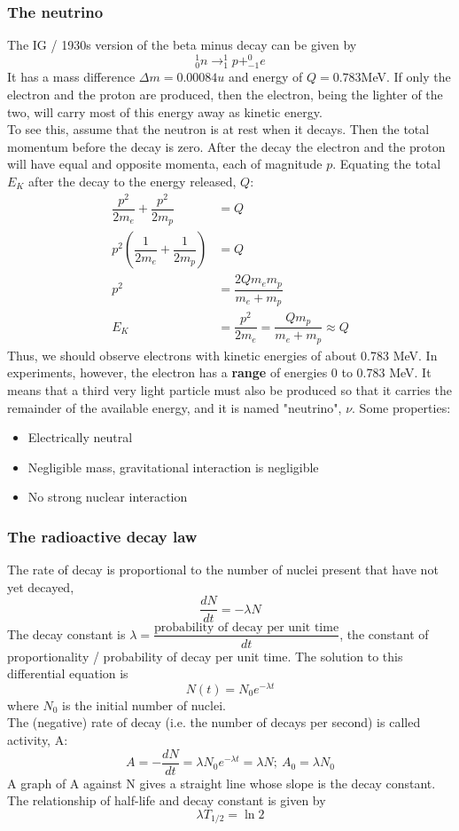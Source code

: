 \documentclass[a4paper,12pt]{article}
\begin{document}
\subsubsection*{The neutrino}
The IG / 1930s version of the beta minus decay can be given by
\[^1_0n\rightarrow ^1_1p+^0_{-1}e\]
It has a mass difference $\Delta m=0.00084u$ and energy of $Q=0.783$MeV.
If only the electron and the proton are produced, then the electron, being the lighter of the two, will carry most of this energy away as kinetic energy. \\
To see this, assume that the neutron is at rest when it decays. Then the total momentum before the decay is zero. After the decay the electron and the proton will have equal and opposite momenta, each of magnitude $p$. Equating the total $E_K$ after the decay to the energy released, $Q$:
\[
\begin{aligned}
  \dfrac{p^2}{2m_e}+\dfrac{p^2}{2m_p}&=Q\\
  p^2\left(\dfrac{1}{2m_e}+\dfrac{1}{2m_p}\right)&=Q\\
  p^2&=\dfrac{2Qm_em_p}{m_e+m_p}\\
  E_K&=\dfrac{p^2}{2m_e}=\dfrac{Qm_p}{m_e+m_p}\approx Q
\end{aligned}\]
Thus, we should observe electrons with kinetic energies of about 0.783 MeV. In experiments, however, the electron has a \textbf{range} of energies 0 to 0.783 MeV.
It means that a third very light particle must also be produced so that it carries the remainder of the available energy, and it is named "neutrino", $\nu$. Some properties:
\begin{itemize}
  \item Electrically neutral
  \item Negligible mass, gravitational interaction is negligible
  \item No strong nuclear interaction
\end{itemize}
\subsubsection*{The radioactive decay law}
The rate of decay is proportional to the number of nuclei present that have not yet decayed,
\[\dfrac{dN}{dt}=-\lambda N\]
The decay constant is $\lambda=\dfrac{\text{probability of decay per unit time}}{dt}$, the constant of proportionality / probability of decay per unit time. The solution to this differential equation is
\[N(t)=N_0e^{-\lambda t}\]
where $N_0$ is the initial number of nuclei.\\
The (negative) rate of decay (i.e. the number of decays per second) is called activity, A:
\[A=-\dfrac{dN}{dt}=\lambda N_0e^{-\lambda t}=\lambda N;\ A_0=\lambda N_0\]
A graph of A against N gives a straight line whose slope is the decay constant.\\
The relationship of half-life and decay constant is given by
\[\lambda T_{1/2}=\ln 2\]
\end{document}
